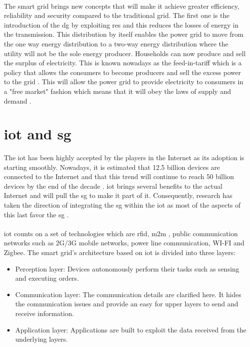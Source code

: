 \documentclass[oneside,12pt,a4paper,final]{book}
\begin{document}
\paragraph{}
The smart grid brings new concepts that will make it achieve greater efficiency, reliability and security compared to the traditional grid. The first one is the introduction of the \gls{dg} by exploiting \gls{res} \cite{ref6} and this reduces the losses of energy in the transmission.  This distribution by itself enables the power grid to move from the one way energy distribution to a two-way energy distribution where the utility will not be the sole energy producer. Households can now produce and sell the surplus of electricity. This is known nowadays as the feed-in-tariff which is a policy that allows the consumers to become producers and sell the excess power to the grid \cite{ref7}. This will allow the power grid to provide electricity to consumers in a "free market" fashion which means that it will obey the laws of supply and demand \cite{ref7}. 
\section{\gls{iot} and \gls{sg}}
\paragraph{}
The \gls{iot} has been highly accepted by the players in the Internet as its adoption is starting smoothly. Nowadays, it is estimated that 12.5 billion devices are connected to the Internet and that this trend will continue to reach 50 billion devices by the end of the decade \cite{ref3}. \gls{iot} brings several benefits to the actual Internet and will pull the \gls{sg} to make it part of it. Consequently, research has taken the direction of integrating the \gls{sg} within the \gls{iot} as most of the aspects of this last favor  the \gls{sg} \cite{ref8}.
\paragraph{}
\gls{iot} counts on a set of technologies which are \gls{rfid}, \gls{m2m} \cite{ref9}, public communication networks such as 2G/3G mobile networks, power line communication, WI-FI and Zigbee\cite{ref8}. The smart grid's architecture based on \gls{iot} is divided into three layers:
\begin{itemize}
\item Perception layer: Devices autonomously perform their tasks such as sensing and executing orders.
\item Communication layer: The communication details are clarified here. It hides the communication issues and provide an easy for upper layers to send and receive information.
\item Application layer: Applications are built to exploit the data received from the underlying layers.
\end{itemize}
\end{document}
